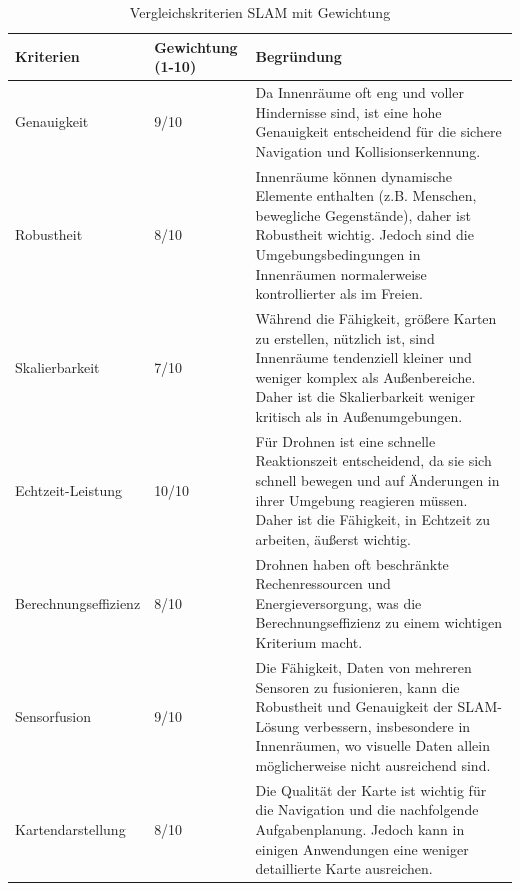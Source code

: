\begin{table}[H]
    \begin{center}
        \begin{tabular}{|p{4cm}|p{1.5cm}|p{10cm}|}
            \hline
             Kriterien & Gewich\-tung (1-10) & Begründung \\\hline
             Genauigkeit & 9/10 & Da Innenräume oft eng und voller Hindernisse sind, ist eine hohe Genauigkeit entscheidend für die sichere Navigation und Kollisionserkennung. \\\hline
             Robustheit & 8/10 & Innenräume können dynamische Elemente enthalten (z.B. Menschen, bewegliche Gegenstände), daher ist Robustheit wichtig. Jedoch sind die Umgebungsbedingungen in Innenräumen normalerweise kontrollierter als im Freien. \\\hline
             Skalierbarkeit & 7/10 & Während die Fähigkeit, größere Karten zu erstellen, nützlich ist, sind Innenräume tendenziell kleiner und weniger komplex als Außenbereiche. Daher ist die Skalierbarkeit weniger kritisch als in Außenumgebungen.\\\hline
             Echtzeit-Leistung & 10/10 & Für Drohnen ist eine schnelle Reaktionszeit entscheidend, da sie sich schnell bewegen und auf Änderungen in ihrer Umgebung reagieren müssen. Daher ist die Fähigkeit, in Echtzeit zu arbeiten, äußerst wichtig.\\\hline
             Berechnungseffizienz & 8/10 & Drohnen haben oft beschränkte Rechenressourcen und Energieversorgung, was die Berechnungseffizienz zu einem wichtigen Kriterium macht. \\\hline
             Sensorfusion & 9/10 & Die Fähigkeit, Daten von mehreren Sensoren zu fusionieren, kann die Robustheit und Genauigkeit der SLAM-Lösung verbessern, insbesondere in Innenräumen, wo visuelle Daten allein möglicherweise nicht ausreichend sind. \\\hline
             Kartendarstellung & 8/10 & Die Qualität der Karte ist wichtig für die Navigation und die nachfolgende Aufgabenplanung. Jedoch kann in einigen Anwendungen eine weniger detaillierte Karte ausreichen. \\
             \hline
        \end{tabular}
        \caption{Vergleichskriterien \ac{SLAM} mit Gewichtung}\label{tab:vergleich-slam-gewichtung}
    \end{center}
\end{table}

